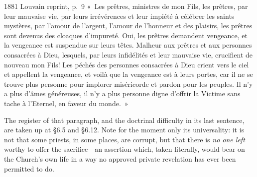 \begin{witnesstext}{1881 Louvain reprint, p.~9}
«~Les prêtres, ministres de mon Fils, les prêtres, par leur mauvaise
vie, par leurs irrévérences et leur impiété à célébrer les saints
mystères, par l'amour de l'argent, l'amour de l'honneur et des
plaisirs, les prêtres sont devenus des cloaques d'impureté. Oui, les
prêtres demandent vengeance, et la vengeance est suspendue sur leurs
têtes. Malheur aux prêtres et aux personnes consacrées à Dieu,
lesquels, par leurs infidélités et leur mauvaise vie, crucifient de
nouveau mon Fils! Les péchés des personnes consacrées à Dieu crient
vers le ciel et appellent la vengeance, et voilà que la vengeance
est à leurs portes, car il ne se trouve plus personne pour implorer
miséricorde et pardon pour les peuples. Il n'y a plus d'âmes
généreuses, il n'y a plus personne digne d'offrir la Victime sans
tache à l'Eternel, en faveur du monde.~»
\end{witnesstext}

The register of that paragraph, and the doctrinal difficulty in its
last sentence, are taken up at \S6.5 and \S6.12. Note for the
moment only its universality: it is not that some priests, in some
places, are corrupt, but that there is \emph{no one left} worthy to
offer the sacrifice---an assertion which, taken literally, would
bear on the Church's own life in a way no approved private
revelation has ever been permitted to do.

